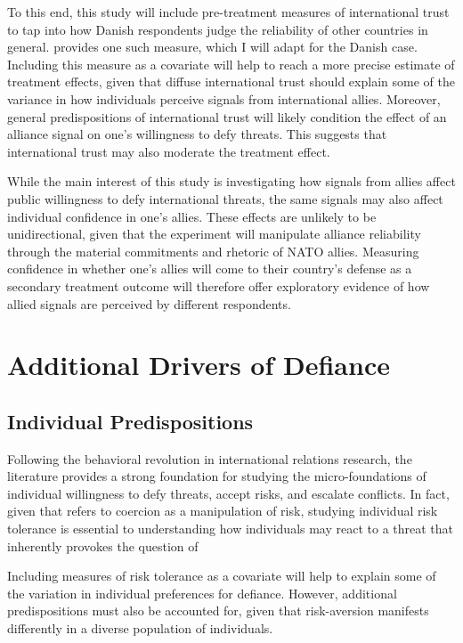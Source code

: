 To this end, this study will include pre-treatment measures of international trust to tap into how Danish respondents judge the reliability of other countries in general. \textcite{brewer_international_2004} provides one such measure, which I will adapt for the Danish case. Including this measure as a covariate will help to reach a more precise estimate of treatment effects, given that diffuse international trust should explain some of the variance in how individuals perceive signals from international allies. Moreover, general predispositions of international trust will likely condition the effect of an alliance signal on one's willingness to defy threats. This suggests that international trust may also moderate the treatment effect.   

While the main interest of this study is investigating how signals from allies affect public willingness to defy international threats, the same signals may also affect individual confidence in one's allies. These effects are unlikely to be unidirectional, given that the experiment will manipulate alliance reliability through the material commitments and rhetoric of NATO allies. Measuring confidence in whether one's allies will come to their country's defense as a secondary treatment outcome will therefore offer exploratory evidence of how allied signals are perceived by different respondents. 

\section{Additional Drivers of Defiance}
\subsection{Individual Predispositions}
Following the behavioral revolution in international relations research, the literature provides a strong foundation for studying the micro-foundations of individual willingness to defy threats, accept risks, and escalate conflicts. In fact, given that \textcite{schelling_arms_1966} refers to coercion as a manipulation of risk, studying individual risk tolerance is essential to understanding how individuals may react to a threat that inherently provokes the question of \autocite{schelling_arms_1966}

Including measures of risk tolerance\autocite{kertzer_resolve_2016, vieider_common_2015} as a covariate will help to explain some of the variation in individual preferences for defiance. However, additional predispositions must also be accounted for, given that risk-aversion manifests differently in a diverse population of individuals. 

